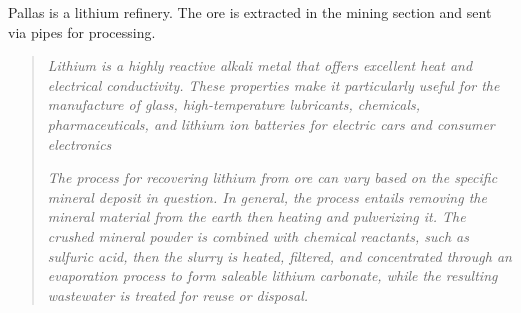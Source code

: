 \begin{rpg-commentbox}{}

\end{rpg-commentbox}

Pallas is a lithium refinery. The ore is extracted in the mining section and sent via pipes for processing. 



\begin{quotation}
\begin{small}
\textit{Lithium is a highly reactive alkali metal that offers excellent heat and electrical conductivity.  These properties make it particularly useful for the manufacture of glass, high-temperature lubricants, chemicals, pharmaceuticals, and lithium ion batteries for electric cars and consumer electronics}

\textit{The process for recovering lithium from ore can vary based on the specific mineral deposit in question. In general, the process entails removing the mineral material from the earth then heating and pulverizing it. The crushed mineral powder is combined with chemical reactants, such as sulfuric acid, then the slurry is heated, filtered, and concentrated through an evaporation process to form saleable lithium carbonate, while the resulting wastewater is treated for reuse or disposal.    }    
\end{small}    
\end{quotation}
